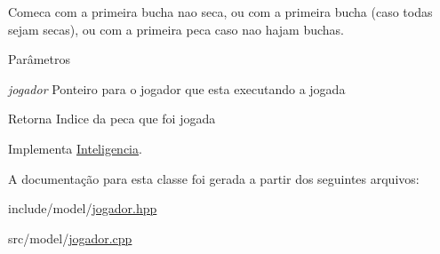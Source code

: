 Comeca com a primeira bucha nao seca, ou com a primeira bucha (caso todas sejam secas), ou com a primeira peca caso nao hajam buchas. 


\begin{DoxyParams}{Parâmetros}
\item[{\em jogador}]Ponteiro para o jogador que esta executando a jogada \end{DoxyParams}
\begin{DoxyReturn}{Retorna}
Indice da peca que foi jogada 
\end{DoxyReturn}


Implementa \hyperlink{classInteligencia_ad66cee21015269f35772042f9fa2b97c}{Inteligencia}.



A documentação para esta classe foi gerada a partir dos seguintes arquivos:\begin{DoxyCompactItemize}
\item 
include/model/\hyperlink{jogador_8hpp}{jogador.hpp}\item 
src/model/\hyperlink{jogador_8cpp}{jogador.cpp}\end{DoxyCompactItemize}
